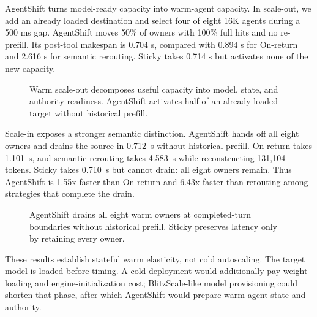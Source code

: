 AgentShift turns model-ready capacity into warm-agent capacity. In scale-out, we add an already loaded destination and select four of eight 16K agents during a 500 ms gap. AgentShift moves 50\% of owners with 100\% full hits and no re-prefill. Its post-tool makespan is 0.704 s, compared with 0.894 s for On-return and 2.616 s for semantic rerouting. Sticky takes 0.714 s but activates none of the new capacity.

\begin{figure}[t]
  \centering
  \caption{Warm scale-out decomposes useful capacity into model, state, and authority readiness. AgentShift activates half of an already loaded target without historical prefill.}
  \label{fig:scaleout}
\end{figure}

Scale-in exposes a stronger semantic distinction. AgentShift hands off all eight owners and drains the source in 0.712~s without historical prefill. On-return takes 1.101~s, and semantic rerouting takes 4.583~s while reconstructing 131,104 tokens. Sticky takes 0.710~s but cannot drain: all eight owners remain. Thus AgentShift is 1.55x faster than On-return and 6.43x faster than rerouting among strategies that complete the drain.

\begin{figure}[t]
  \centering
  \caption{AgentShift drains all eight warm owners at completed-turn boundaries without historical prefill. Sticky preserves latency only by retaining every owner.}
  \label{fig:scalein}
\end{figure}

These results establish stateful warm elasticity, not cold autoscaling. The target model is loaded before timing. A cold deployment would additionally pay weight-loading and engine-initialization cost; BlitzScale-like model provisioning could shorten that phase, after which AgentShift would prepare warm agent state and authority.

